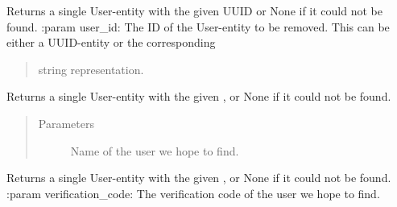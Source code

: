 \documentclass[letterpaper,10pt,english]{sphinxmanual}
\begin{document}

\begin{fulllineitems}
\label{\detokenize{pydash_app.user:pydash_app.user.check_password_requirements}}
\end{fulllineitems}


\begin{fulllineitems}
\label{\detokenize{pydash_app.user:pydash_app.user.find}}
Returns a single User-entity with the given UUID or None if it could not be found.
:param user\_id: The ID of the User-entity to be removed. This can be either a UUID-entity or the corresponding
\begin{quote}

string representation.
\end{quote}

\end{fulllineitems}


\begin{fulllineitems}
\label{\detokenize{pydash_app.user:pydash_app.user.find_by_name}}
Returns a single User-entity with the given , or None if it could not be found.
\begin{quote}\begin{description}
\item[{Parameters}] \leavevmode
{} \textendash{} Name of the user we hope to find.

\end{description}\end{quote}

\end{fulllineitems}


\begin{fulllineitems}
\label{\detokenize{pydash_app.user:pydash_app.user.find_by_verification_code}}
Returns a single User-entity with the given , or None if it could not be found.
:param verification\_code: The verification code of the user we hope to find.

\end{fulllineitems}
\end{document}
